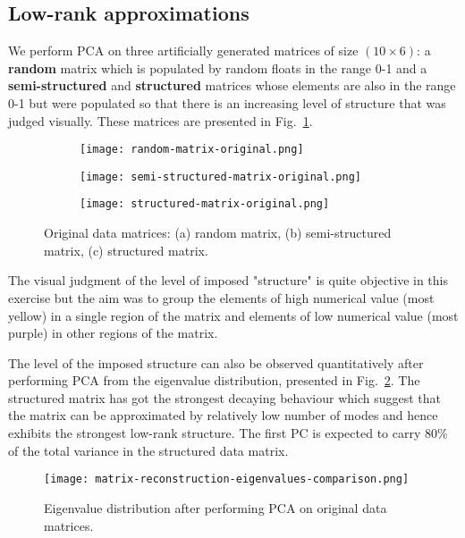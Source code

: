 \documentclass[10pt,twocolumn]{article}
\begin{document}
\subsection{Low-rank approximations}

We perform PCA on three artificially generated matrices of size $(10 \times 6)$: a \textbf{random} matrix which is populated by random floats in the range 0-1 and a \textbf{semi-structured} and \textbf{structured} matrices whose elements are also in the range 0-1 but were populated so that there is an increasing level of structure that was judged visually. These matrices are presented in Fig.~\ref{fig:matrices}.

\begin{figure}[H]
\begin{subfigure}[t]{.15\textwidth}
\centering
\texttt{[image: random-matrix-original.png]}
\caption{ }
\end{subfigure}
\begin{subfigure}[t]{.15\textwidth}
\centering
\texttt{[image: semi-structured-matrix-original.png]}
\caption{ }
\end{subfigure}
\begin{subfigure}[t]{.15\textwidth}
\centering
\texttt{[image: structured-matrix-original.png]}
\caption{ }
\end{subfigure}
\caption{Original data matrices: (a) random matrix, (b) semi-structured matrix, (c) structured matrix.}
\label{fig:matrices}
\end{figure}

The visual judgment of the level of imposed "structure" is quite objective in this exercise but the aim was to group the elements of high numerical value (most yellow) in a single region of the matrix and elements of low numerical value (most purple) in other regions of the matrix.

The level of the imposed structure can also be observed quantitatively after performing PCA from the eigenvalue distribution, presented in Fig.~\ref{fig:eigenvalues}. The structured matrix has got the strongest decaying behaviour which suggest that the matrix can be approximated by relatively low number of modes and hence exhibits the strongest low-rank structure. The first PC is expected to carry 80\% of the total variance in the structured data matrix.

\begin{figure}[t]
\centering\texttt{[image: matrix-reconstruction-eigenvalues-comparison.png]}
\caption{Eigenvalue distribution after performing PCA on original data matrices.}			
\label{fig:eigenvalues}
\end{figure}
\end{document}
